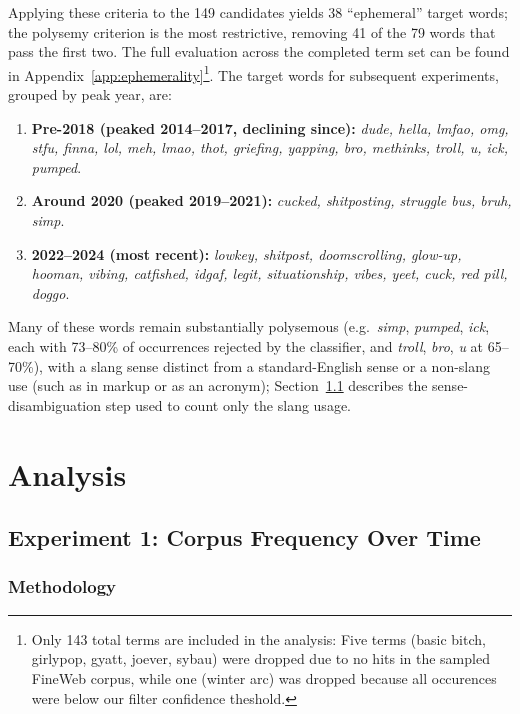 \documentclass[11pt]{article}
\begin{document}
Applying these criteria to the 149 candidates yields 38 ``ephemeral'' target words; the polysemy criterion is the most restrictive, removing 41 of the 79 words that pass the first two. The full evaluation across the completed term set can be found in Appendix~\ref{app:ephemerality}\footnote{Only 143 total terms are included in the analysis: Five terms (basic bitch, girlypop, gyatt, joever, sybau) were dropped due to no hits in the sampled FineWeb corpus, while one (winter arc) was dropped because all occurences were below our filter confidence theshold.}. The target words for subsequent experiments, grouped by peak year, are:
\begin{enumerate}
  \item \textbf{Pre-2018 (peaked 2014--2017, declining since):} \textit{dude, hella, lmfao, omg, stfu, finna, lol, meh, lmao, thot, griefing, yapping, bro, methinks, troll, u, ick, pumped}.
  \item \textbf{Around 2020 (peaked 2019--2021):} \textit{cucked, shitposting, struggle bus, bruh, simp}.
  \item \textbf{2022--2024 (most recent):} \textit{lowkey, shitpost, doomscrolling, glow-up, hooman, vibing, catfished, idgaf, legit, situationship, vibes, yeet, cuck, red pill, doggo}.
\end{enumerate}

Many of these words remain substantially polysemous (e.g.\ \textit{simp}, \textit{pumped}, \textit{ick}, each with 73--80\% of occurrences rejected by the classifier, and \textit{troll}, \textit{bro}, \textit{u} at 65--70\%), with a slang sense distinct from a standard-English sense or a non-slang use (such as in markup or as an acronym); Section~\ref{sec:exp1} describes the sense-disambiguation step used to count only the slang usage. 

\section{Analysis}

\subsection{Experiment 1: Corpus Frequency Over Time}%
\label{sec:exp1}

\subsubsection{Methodology}%
\label{sec:exp1-method}
\end{document}
